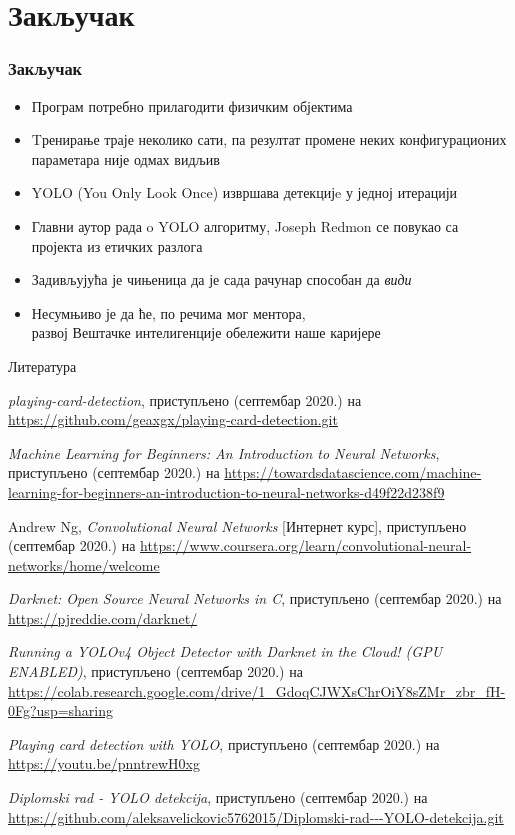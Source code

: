 \section{Закључак}
\begin{frame}
\frametitle{Закључак}
\begin{itemize}
 \item Програм потребно прилагодити физичким објектима
 \item Tренирање траје неколико сати, па резултат
  промене неких конфигурационих параметара није одмах видљив
 \item YOLO (You Only Look Once) извршава детекцијe у једној итерацији
 \item Главни
  аутор рада o YOLO алгоритму, Joseph Redmon
  се повукао са пројекта из етичких разлога
 \item Задивљујућа је чињеница да је сада рачунар
 способан да \textit{види}
 \item Несумњиво је да ће, по речима мог ментора,\\
\alert{развој Вештачке интелигенције обележити наше каријере}
\end{itemize}
\end{frame}

\begin{frame}[allowframebreaks]{Литература}

\begin{thebibliography}{99}

\textit{playing-card-detection}, приступљено (септембар 2020.) на
\url{https://github.com/geaxgx/playing-card-detection.git}

\textit{Machine Learning for Beginners: An Introduction to Neural Networks}, приступљено (септембар 2020.) на
\url{https://towardsdatascience.com/machine-learning-for-beginners-an-introduction-to-neural-networks-d49f22d238f9}

Andrew Ng, \textit{Convolutional Neural Networks} [Интернет курс], приступљено (септембар 2020.) на
\url{https://www.coursera.org/learn/convolutional-neural-networks/home/welcome}

\textit{Darknet: Open Source Neural Networks in C}, приступљено (септембар 2020.) на
\url{https://pjreddie.com/darknet/}

\textit{Running a YOLOv4 Object Detector with Darknet in the Cloud! (GPU ENABLED)}, приступљено (септембар 2020.) на
\url{https://colab.research.google.com/drive/1_GdoqCJWXsChrOiY8sZMr_zbr_fH-0Fg?usp=sharing}

\textit{Playing card detection with YOLO}, приступљено (септембар 2020.) на
\url{https://youtu.be/pnntrewH0xg}

\textit{Diplomski rad - YOLO detekcija}, приступљено (септембар 2020.) на
\url{https://github.com/aleksavelickovic5762015/Diplomski-rad---YOLO-detekcija.git}

\end{thebibliography}

\end{frame}


